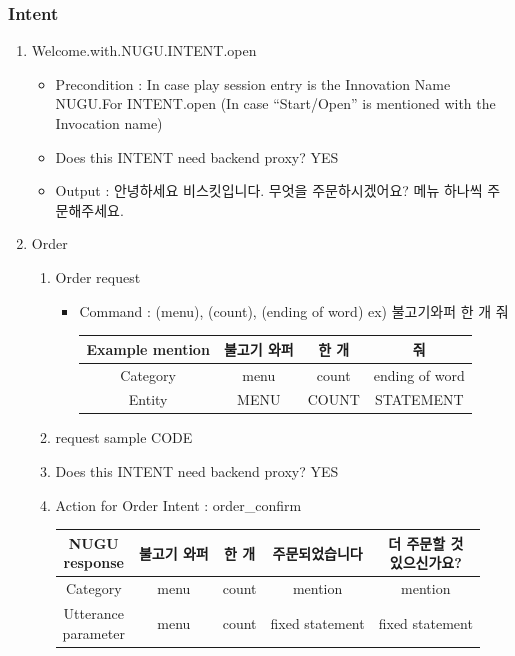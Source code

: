 \documentclass[conference,compsoc]{IEEEtran}
\begin{document}
\subsubsection{Intent}
\begin{enumerate}
  \item Welcome.with.NUGU.INTENT.open
  \begin{itemize}
    \item Precondition : In case play session entry is the Innovation Name NUGU.For INTENT.open (In case “Start/Open” is mentioned with the Invocation name)
    \item Does this INTENT need backend proxy? YES
    \item Output : 안녕하세요 비스킷입니다. 무엇을 주문하시겠어요? 메뉴 하나씩 주문해주세요.
  \end{itemize}
  
  \item Order
  \begin{enumerate}
    \item Order request
    \begin{itemize}
      \item Command : (menu), (count), (ending of word) ex) 불고기와퍼 한 개 줘
      \begin{table}[ht!] \renewcommand\arraystretch{1.25}
      \centering
      \begin{tabular}{@{}c | c c c@{}}
      \hline
      Example mention & 불고기 와퍼 & 한 개  & 줘               \\ 
      \hline
      Category        & menu   & count & ending of word  \\ 
      \hline
      Entity          & MENU   & COUNT & STATEMENT       \\
      \hline
      \end{tabular}
      \end{table}      
    \end{itemize}
    
    \item request sample
    CODE
    
    \item Does this INTENT need backend proxy? YES
    
    \item Action for Order Intent : order\_confirm
    \begin{table}[ht!] \renewcommand\arraystretch{1.25}
      \centering
        \begin{tabular}{@{}c | c c c c@{}}
        \hline
        \makecell{NUGU \\ response} & 불고기 와퍼 & 한 개 & 주문되었습니다 & \makecell{더 주문할 것 \\ 있으신가요?}  \\ 
        \hline
        Category        & menu   & count & mention & mention  \\ 
        \hline
        \makecell{Utterance \\ parameter}  & {{menu}}   & {{count}} & fixed statement & fixed statement       \\
        \hline
        \end{tabular}
    \end{table}  
  

\end{enumerate}
\end{enumerate}
\end{document}
